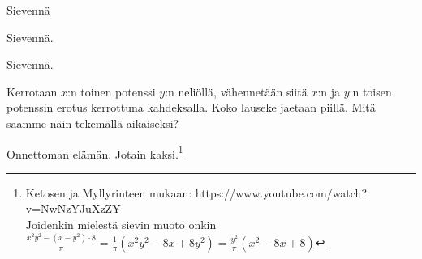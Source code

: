 \begin{tehtavasivu}
\begin{tehtava}
        Sievennä
        \begin{vastaus}
        \end{vastaus}
\end{tehtava}

\begin{tehtava}
     Sievennä.
        \begin{vastaus}
        \end{vastaus}
\end{tehtava}
    
\begin{tehtava}
        \begin{vastaus}
        \end{vastaus}
\end{tehtava}
    
\begin{tehtava}
        Sievennä.
        \begin{vastaus}
        \end{vastaus}
\end{tehtava}
    
\begin{tehtava}
    Kerrotaan $x$:n toinen potenssi $y$:n neliöllä, vähennetään siitä $x$:n ja $y$:n toisen potenssin erotus kerrottuna kahdeksalla. Koko lauseke jaetaan piillä. Mitä saamme näin tekemällä aikaiseksi?
    	\begin{vastaus}
    	Onnettoman elämän. Jotain kaksi.\footnote{Ketosen ja Myllyrinteen mukaan: https://www.youtube.com/watch?v=NwNzYJuXzZY \\ Joidenkin mielestä sievin muoto onkin $\frac{x^2y^2-(x-y^2)\cdot 8}{\pi}=\frac{1}{\pi}(x^2y^2-8x+8y^2)=\frac{y^2}{\pi}(x^2-8x+8)$}
    	\end{vastaus}
\end{tehtava}


\end{tehtavasivu}
